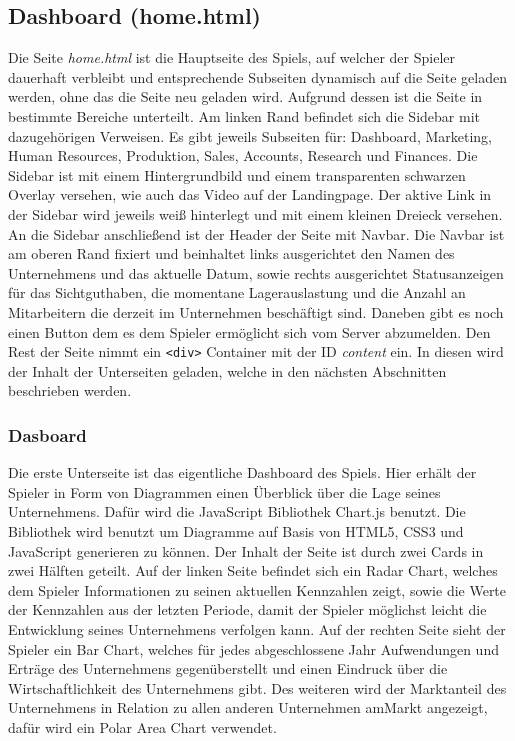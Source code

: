\subsection{Dashboard (home.html)}
Die Seite \textit{home.html} ist die Hauptseite des Spiels, auf welcher der Spieler dauerhaft verbleibt und entsprechende Subseiten dynamisch auf die Seite geladen werden, ohne das die Seite neu geladen wird. Aufgrund dessen ist die Seite in bestimmte Bereiche unterteilt. Am linken Rand befindet sich die Sidebar mit dazugehörigen Verweisen. Es gibt jeweils Subseiten für: Dashboard, Marketing, Human Resources, Produktion, Sales, Accounts, Research und Finances. Die Sidebar ist mit einem Hintergrundbild und einem transparenten schwarzen Overlay versehen, wie auch das Video auf der Landingpage. Der aktive Link in der Sidebar wird jeweils weiß hinterlegt und mit einem kleinen Dreieck versehen. An die Sidebar anschließend ist der Header der Seite mit Navbar. Die Navbar ist am oberen Rand fixiert und beinhaltet links ausgerichtet den Namen des Unternehmens und das aktuelle Datum, sowie rechts ausgerichtet Statusanzeigen für das Sichtguthaben, die momentane Lagerauslastung und die Anzahl an Mitarbeitern die derzeit im Unternehmen beschäftigt sind. Daneben gibt es noch einen Button dem es dem Spieler ermöglicht sich vom Server abzumelden. Den Rest der Seite nimmt ein \verb!<div>! Container mit der ID \textit{content} ein. In diesen wird der Inhalt der Unterseiten geladen, welche in den nächsten Abschnitten beschrieben werden.

\subsubsection{Dasboard}
 Die erste Unterseite ist das eigentliche Dashboard des Spiels. Hier erhält der Spieler in Form von Diagrammen einen Überblick über die Lage seines Unternehmens. Dafür wird die JavaScript Bibliothek Chart.js benutzt\cite{C}. Die Bibliothek wird benutzt um Diagramme auf Basis von HTML5, CSS3 und JavaScript generieren zu können. Der Inhalt der Seite ist durch zwei Cards in zwei Hälften geteilt. Auf der linken Seite befindet sich ein Radar Chart, welches dem Spieler Informationen zu seinen aktuellen Kennzahlen zeigt, sowie die Werte der Kennzahlen aus der letzten Periode, damit der Spieler möglichst leicht die Entwicklung seines Unternehmens verfolgen kann. Auf der rechten Seite sieht der Spieler ein Bar Chart, welches für jedes abgeschlossene Jahr Aufwendungen und Erträge des Unternehmens gegenüberstellt und einen Eindruck über die Wirtschaftlichkeit des Unternehmens gibt. Des weiteren wird der Marktanteil des Unternehmens in Relation zu allen anderen Unternehmen amMarkt angezeigt, dafür wird ein Polar Area Chart verwendet.

